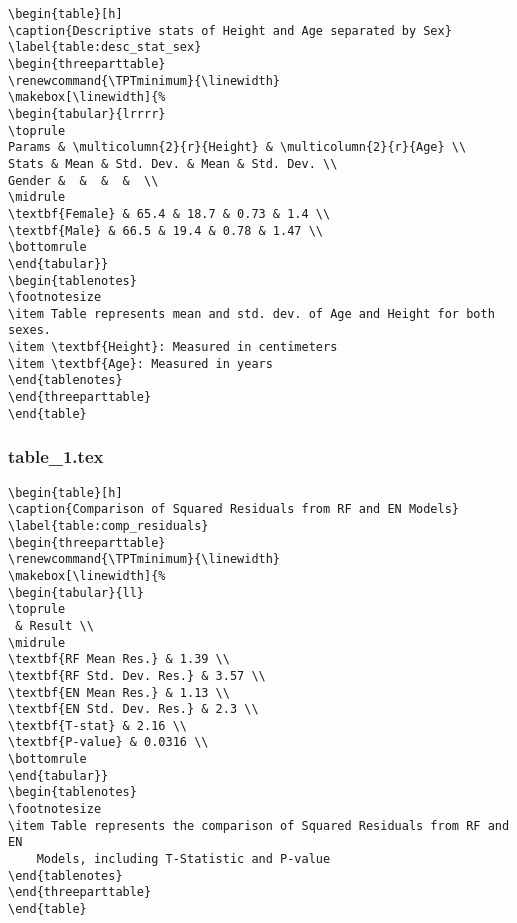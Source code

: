 \documentclass[11pt]{article}
\begin{document}
\begin{Verbatim}[tabsize=4]
\begin{table}[h]
\caption{Descriptive stats of Height and Age separated by Sex}
\label{table:desc_stat_sex}
\begin{threeparttable}
\renewcommand{\TPTminimum}{\linewidth}
\makebox[\linewidth]{%
\begin{tabular}{lrrrr}
\toprule
Params & \multicolumn{2}{r}{Height} & \multicolumn{2}{r}{Age} \\
Stats & Mean & Std. Dev. & Mean & Std. Dev. \\
Gender &  &  &  &  \\
\midrule
\textbf{Female} & 65.4 & 18.7 & 0.73 & 1.4 \\
\textbf{Male} & 66.5 & 19.4 & 0.78 & 1.47 \\
\bottomrule
\end{tabular}}
\begin{tablenotes}
\footnotesize
\item Table represents mean and std. dev. of Age and Height for both sexes.
\item \textbf{Height}: Measured in centimeters
\item \textbf{Age}: Measured in years
\end{tablenotes}
\end{threeparttable}
\end{table}

\end{Verbatim}

\subsubsection*{table\_1.tex}

\begin{Verbatim}[tabsize=4]
\begin{table}[h]
\caption{Comparison of Squared Residuals from RF and EN Models}
\label{table:comp_residuals}
\begin{threeparttable}
\renewcommand{\TPTminimum}{\linewidth}
\makebox[\linewidth]{%
\begin{tabular}{ll}
\toprule
 & Result \\
\midrule
\textbf{RF Mean Res.} & 1.39 \\
\textbf{RF Std. Dev. Res.} & 3.57 \\
\textbf{EN Mean Res.} & 1.13 \\
\textbf{EN Std. Dev. Res.} & 2.3 \\
\textbf{T-stat} & 2.16 \\
\textbf{P-value} & 0.0316 \\
\bottomrule
\end{tabular}}
\begin{tablenotes}
\footnotesize
\item Table represents the comparison of Squared Residuals from RF and EN
	Models, including T-Statistic and P-value
\end{tablenotes}
\end{threeparttable}
\end{table}

\end{Verbatim}
\end{document}
